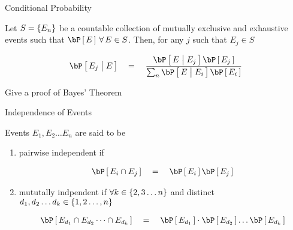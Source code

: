 \documentclass{article}
\begin{document}
\begin{ssection}{Conditional Probability}
	\begin{theorem}
		Let $S = \left\{ {E_n} \right\}$ be a countable collection of mutually exclusive and exhaustive events such that $\prob{E} \qforall E \in S$. Then, for any $j$ such that $E_j \in S$

		\begin{align*}
			\prob{E_j \pipe E}	\eq	\frac{\prob{E \pipe E_j} \prob{E_j}}{\sum_{n} \prob{E \pipe E_i} \prob{E_i}}
		\end{align*}
		\label{th:bayes}
	\end{theorem}

	\begin{exercise}
		Give a proof of Bayes' Theorem
	\end{exercise}

\end{ssection}

\begin{ssection}{Independence of Events}

	\begin{definition}
		Events $E_1, E_2 \dots E_n$ are said to be 

		\begin{enumerate}[label=(\roman*)]
			\item pairwise independent if

				\begin{align*}
					\prob{E_i \cap E_j}	\eq	\prob{E_i}\prob{E_j}
				\end{align*}
			\item mututally indpendent if $\forall k \in \left\{ {2, 3 \dots n} \right\}$ and distinct $d_1, d_2 \dots d_k \in \left\{ {1, 2 \dots, n} \right\}$

				\begin{align*}
					\prob{E_{d_1} \cap E_{d_2} \dots \cap E_{d_k}}	\eq	\prob{E_{d_1}} \cdot \prob{E_{d_2}} \dots \prob{E_{d_k}} 
				\end{align*}
		\end{enumerate}
		\label{def:independence_events}
	\end{definition}


\end{ssection}
\end{document}
